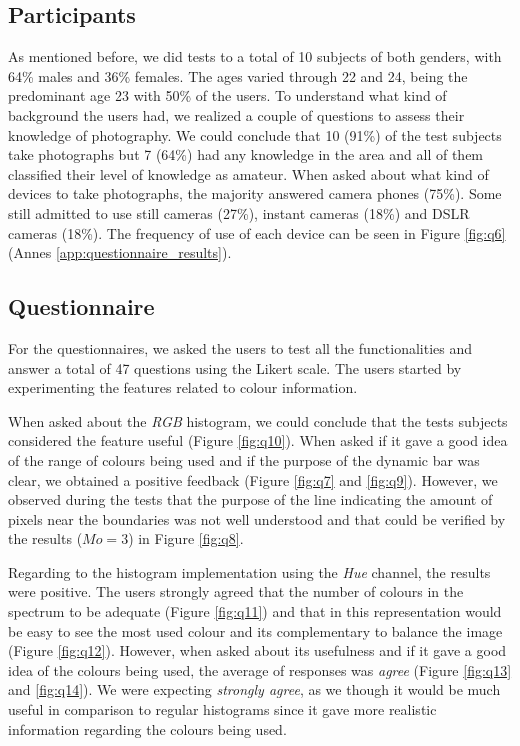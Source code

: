 \subsection{Participants}

As mentioned before, we did tests to a total of 10 subjects of both genders, with 64\% males and 36\% females. The ages varied through 22 and 24, being the predominant age 23 with 50\% of the users. To understand what kind of background the users had, we realized a couple of questions to assess their knowledge of photography. We could conclude that 10 (91\%) of the test subjects take photographs but 7 (64\%) had any knowledge in the area and all of them classified their level of knowledge as amateur. When asked about what kind of devices to take photographs, the majority answered camera phones (75\%). Some still admitted to use still cameras (27\%), instant cameras (18\%) and DSLR cameras (18\%). The frequency of use of each device can be seen in Figure \ref{fig:q6} (Annes \ref{app:questionnaire_results}).

\subsection{Questionnaire}

For the questionnaires, we asked the users to test all the functionalities and answer a total of 47 questions using the Likert scale. The users started by experimenting the features related to colour information. 

When asked about the \emph{RGB} histogram, we could conclude that the tests subjects considered the feature useful (Figure \ref{fig:q10}). When asked if it gave a good idea of the range of colours being used and if the purpose of the dynamic bar was clear, we obtained a positive feedback (Figure \ref{fig:q7} and \ref{fig:q9}). However, we observed during the tests that the purpose of the line indicating the amount of pixels near the boundaries was not well understood and that could be verified by the results ($Mo = 3$) in Figure \ref{fig:q8}.

Regarding to the histogram implementation using the \emph{Hue} channel, the results were positive. The users strongly agreed that the number of colours in the spectrum to be adequate (Figure \ref{fig:q11}) and that in this representation would be easy to see the most used colour and its complementary to balance the image (Figure \ref{fig:q12}). However, when asked about its usefulness and if it gave a good idea of the colours being used, the average of responses was \emph{agree} (Figure \ref{fig:q13} and \ref{fig:q14}). We were expecting \emph{strongly agree}, as we though it would be much useful in comparison to regular histograms since it gave more realistic information regarding the colours being used.

